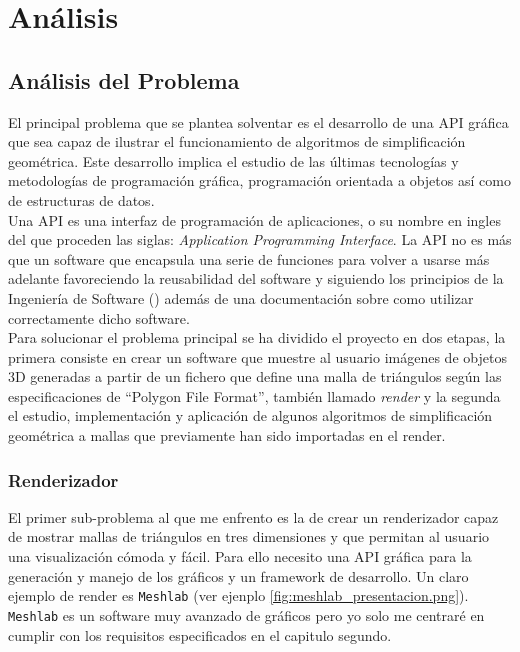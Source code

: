 \chapter{ Análisis}

\section{ Análisis del Problema}
El principal problema que se plantea solventar es el desarrollo de una API gráfica que sea capaz de ilustrar el funcionamiento de algoritmos de simplificación geométrica. Este desarrollo implica el estudio de las últimas tecnologías y metodologías de programación gráfica, programación orientada a objetos así como de estructuras de datos.\\

Una API es una interfaz de programación de aplicaciones, o su nombre en ingles del que proceden las siglas: \textit{Application Programming Interface}. La API no es más que un software que encapsula una serie de funciones para volver a usarse más adelante favoreciendo la reusabilidad del software y siguiendo los principios de la Ingeniería de Software (\cite{sommervilleSoftwareEngineeringGlobal2016}) además de una documentación sobre como utilizar correctamente dicho software.\\ 


Para solucionar el problema principal se ha dividido el proyecto en dos etapas, la primera consiste en crear un software que muestre al usuario imágenes de objetos 3D generadas a partir de un fichero que define una malla de triángulos según las especificaciones de ``Polygon File Format'', también llamado \textit{render} y la segunda el estudio, implementación y aplicación de algunos algoritmos de simplificación geométrica a mallas que previamente han sido importadas en el render.

\subsection{ Renderizador}
El primer sub-problema al que me enfrento es la de crear un renderizador capaz de mostrar mallas de triángulos en tres dimensiones y que permitan al usuario una visualización cómoda y fácil. Para ello necesito una API gráfica para la generación y manejo de los gráficos y un framework de desarrollo. Un claro ejemplo de render es \texttt{Meshlab} (ver ejenplo \ref{fig:meshlab_presentacion.png}). \texttt{Meshlab} es un software muy avanzado de gráficos pero yo solo me centraré en  cumplir con los requisitos especificados en el capitulo segundo.\\

